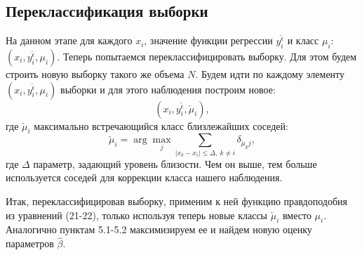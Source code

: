 \documentclass[12pt]{article}
\begin{document}
\subsection{Переклассификация выборки}
На данном этапе для каждого $x_i$, значение функции регрессии $y_i^{\widetilde{\epsilon}}$ и класс $\mu_i$: $(x_i,y_i^{\widetilde{\epsilon}},\mu_i)$.
Теперь попытаемся переклассифицировать выборку. 
Для этом будем строить новую выборку такого же объема $N$.
Будем идти по каждому элементу $(x_i, y_i^{\widetilde{\epsilon}}, \mu_i)$ выборки и для этого наблюдения построим новое:
\begin{equation}
    (x_i, y_i^{\widetilde{\epsilon}},\check{\mu}_i),
\end{equation}
где $\check{\mu}_i$ максимально встречающийся класс близлежайших соседей:
\begin{equation}
    \check{\mu}_i = \arg\max_j \sum_{|x_k-x_i|\leq \Delta,~k\neq i} \delta_{\check{\mu}_k j},
\end{equation}
где $\Delta$ параметр, задающий уровень близости. Чем он выше, тем больше используется соседей для коррекции класса нашего наблюдения.

Итак, переклассифицировав выборку, применим к ней функцию правдоподобия из уравнений (21-22), только используя теперь новые классы $\check{\mu}_i$ вместо $\mu_i$. 
Аналогично пунктам 5.1-5.2 максимизируем ее и найдем новую оценку параметров $\hat{\beta}$.
\end{document}
